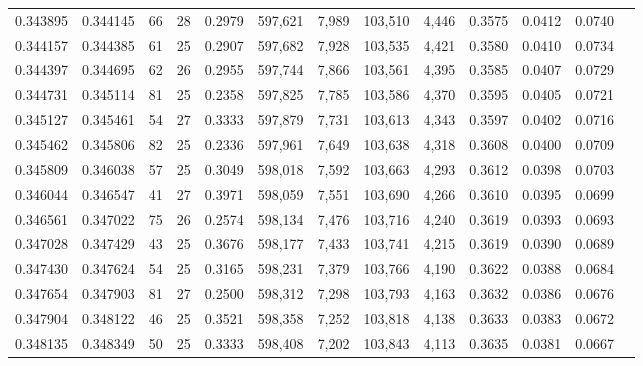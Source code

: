 \begin{tabular}{rrrrrrrrrrrrr}
0.343895 & 0.344145 &  66 &  28 &                                     0.2979 & 597,621 &   7,989 & 103,510 &   4,446 & 0.3575 & 0.0412 & 0.0740 \\
0.344157 & 0.344385 &  61 &  25 &                                     0.2907 & 597,682 &   7,928 & 103,535 &   4,421 & 0.3580 & 0.0410 & 0.0734 \\
0.344397 & 0.344695 &  62 &  26 &                                     0.2955 & 597,744 &   7,866 & 103,561 &   4,395 & 0.3585 & 0.0407 & 0.0729 \\
0.344731 & 0.345114 &  81 &  25 &                                     0.2358 & 597,825 &   7,785 & 103,586 &   4,370 & 0.3595 & 0.0405 & 0.0721 \\
0.345127 & 0.345461 &  54 &  27 &                                     0.3333 & 597,879 &   7,731 & 103,613 &   4,343 & 0.3597 & 0.0402 & 0.0716 \\
0.345462 & 0.345806 &  82 &  25 &                                     0.2336 & 597,961 &   7,649 & 103,638 &   4,318 & 0.3608 & 0.0400 & 0.0709 \\
0.345809 & 0.346038 &  57 &  25 &                                     0.3049 & 598,018 &   7,592 & 103,663 &   4,293 & 0.3612 & 0.0398 & 0.0703 \\
0.346044 & 0.346547 &  41 &  27 &                                     0.3971 & 598,059 &   7,551 & 103,690 &   4,266 & 0.3610 & 0.0395 & 0.0699 \\
0.346561 & 0.347022 &  75 &  26 &                                     0.2574 & 598,134 &   7,476 & 103,716 &   4,240 & 0.3619 & 0.0393 & 0.0693 \\
0.347028 & 0.347429 &  43 &  25 &                                     0.3676 & 598,177 &   7,433 & 103,741 &   4,215 & 0.3619 & 0.0390 & 0.0689 \\
0.347430 & 0.347624 &  54 &  25 &                                     0.3165 & 598,231 &   7,379 & 103,766 &   4,190 & 0.3622 & 0.0388 & 0.0684 \\
0.347654 & 0.347903 &  81 &  27 &                                     0.2500 & 598,312 &   7,298 & 103,793 &   4,163 & 0.3632 & 0.0386 & 0.0676 \\
0.347904 & 0.348122 &  46 &  25 &                                     0.3521 & 598,358 &   7,252 & 103,818 &   4,138 & 0.3633 & 0.0383 & 0.0672 \\
0.348135 & 0.348349 &  50 &  25 &                                     0.3333 & 598,408 &   7,202 & 103,843 &   4,113 & 0.3635 & 0.0381 & 0.0667 \\

\end{tabular}
